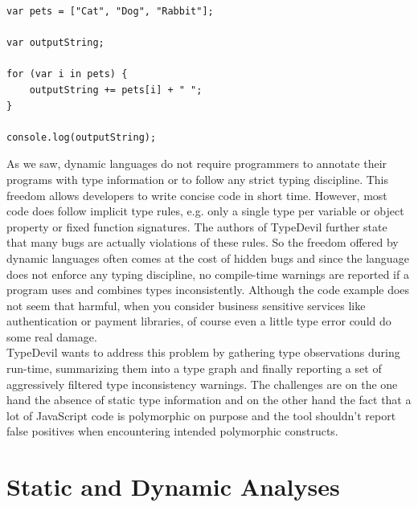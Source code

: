 \documentclass[runningheads,a4paper]{llncs}
\begin{document}
\medskip\medskip
\lstset{language=javascript}
\begin{minipage}{\linewidth}
\begin{lstlisting}[frame=single, caption=Implicit Coercions, label={listingPets}] 
var pets = ["Cat", "Dog", "Rabbit"];

var outputString;

for (var i in pets) {
    outputString += pets[i] + " ";
}

console.log(outputString);
\end{lstlisting}
\end{minipage}

As we saw, dynamic languages do not require programmers to annotate their programs with type information or to follow any strict typing discipline. 
This freedom allows developers to write concise code in short time. 
However, most code does follow implicit type rules, e.g. only a single type per variable or object property or fixed function signatures.
The authors of TypeDevil further state that many bugs are actually violations of these rules.
So the freedom offered by dynamic languages often comes at the cost of hidden bugs and since the language does not enforce any typing discipline, no compile-time warnings are reported if a program uses and combines types inconsistently.
Although the code example does not seem that harmful, when you consider business sensitive services like authentication or payment libraries, of course even a little type error could do some real damage. \\
TypeDevil wants to address this problem by gathering type observations during run-time, summarizing them into a type graph and finally reporting a set of aggressively filtered type inconsistency warnings.
The challenges are on the one hand the absence of static type information and on the other hand the fact that a lot of JavaScript code is polymorphic on purpose and the tool shouldn't report false positives when encountering intended polymorphic constructs.

\section{Static and Dynamic Analyses} \label{staticDynamicAnalysis}
\end{document}
